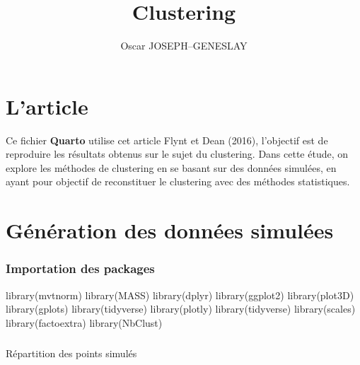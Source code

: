 \documentclass[
  french,
  letterpaper,
  DIV=11,
  numbers=noendperiod]{scrartcl}
\title{Clustering}
\author{Oscar JOSEPH--GENESLAY}
\date{}
\makeatletter
\let\oldsubparagraph\subparagraph
\renewcommand{\subparagraph}{
    \@ifstar
      \xxxSubParagraphStar
      \xxxSubParagraphNoStar
  }
\newcommand{\xxxSubParagraphStar}[1]{\oldsubparagraph*{#1}\mbox{}}
\newcommand{\xxxSubParagraphNoStar}[1]{\oldsubparagraph{#1}\mbox{}}
\newenvironment{Shaded}{\begin{snugshade}}{\end{snugshade}}
\newcommand{\FunctionTok}[1]{\textcolor[rgb]{0.28,0.35,0.67}{#1}}
\newcommand{\NormalTok}[1]{\textcolor[rgb]{0.00,0.23,0.31}{#1}}
\renewcommand*\contentsname{Table des matières}
\newcommand\contentsname{Table des matières}
\makeatother
\begin{document}
\maketitle

\renewcommand*\contentsname{Table des matières}
{
\setcounter{tocdepth}{3}
\tableofcontents
}

\section{L'article}\label{larticle}

Ce fichier \textbf{Quarto} utilise cet article Flynt et Dean (2016),
l'objectif est de reproduire les résultats obtenus sur le sujet du
clustering. Dans cette étude, on explore les méthodes de clustering en
se basant sur des données simulées, en ayant pour objectif de
reconstituer le clustering avec des méthodes statistiques.

\section{Génération des données
simulées}\label{guxe9nuxe9ration-des-donnuxe9es-simuluxe9es}

\subsubsection{Importation des packages}\label{importation-des-packages}

\begin{Shaded}
\begin{Highlighting}[]
\FunctionTok{library}\NormalTok{(mvtnorm)}
\FunctionTok{library}\NormalTok{(MASS)}
\FunctionTok{library}\NormalTok{(dplyr)}
\FunctionTok{library}\NormalTok{(ggplot2)}
\FunctionTok{library}\NormalTok{(plot3D)}
\FunctionTok{library}\NormalTok{(gplots)}
\FunctionTok{library}\NormalTok{(tidyverse)}
\FunctionTok{library}\NormalTok{(plotly)}
\FunctionTok{library}\NormalTok{(tidyverse)}
\FunctionTok{library}\NormalTok{(scales)}
\FunctionTok{library}\NormalTok{(factoextra)}
\FunctionTok{library}\NormalTok{(NbClust)}
\end{Highlighting}
\end{Shaded}

\subparagraph{Répartition des points
simulés}\label{ruxe9partition-des-points-simuluxe9s}
\end{document}
